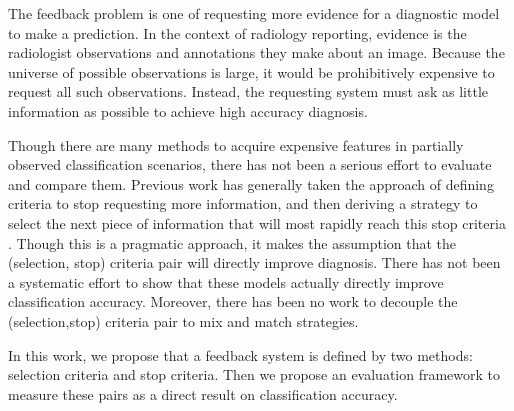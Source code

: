 The feedback problem is one of requesting more evidence for a diagnostic model to make a prediction. In the context of radiology reporting, evidence is the radiologist observations and annotations they make about an image. Because the universe of possible observations is large, it would be prohibitively expensive to request all such observations. Instead, the requesting system must ask as little information as possible to achieve high accuracy diagnosis.

Though there are many methods to acquire expensive features in partially observed classification scenarios, there has not been a serious effort to evaluate and compare them. Previous work has generally taken the approach of defining criteria to stop requesting more information, and then deriving a strategy to select the next piece of information that will most rapidly reach this stop criteria \cite{Heckerman:1992uq,Chi:tp,SaarTsechansky:2009bu}. Though this is a pragmatic approach, it makes the assumption that the (selection, stop) criteria pair will directly improve diagnosis. There has not been a systematic effort to show that these models actually directly improve classification accuracy. Moreover, there has been no work to decouple the (selection,stop) criteria pair to mix and match strategies. 

In this work, we propose that a feedback system is defined by two methods: selection criteria and stop criteria. Then we propose an evaluation framework to measure these pairs as a direct result on classification accuracy.